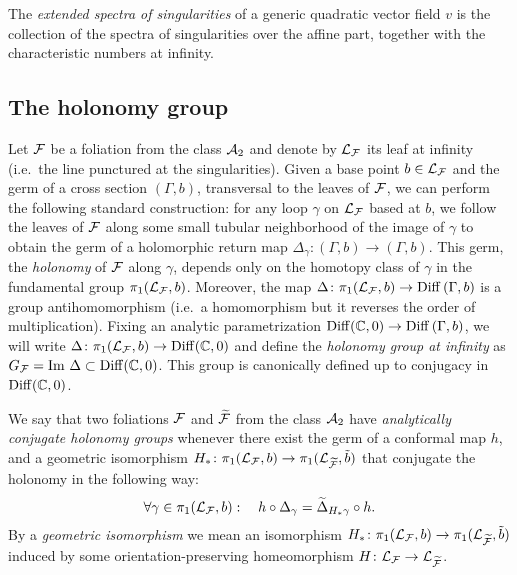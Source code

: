 \documentclass[phd,tocprelim]{cornell}
\begin{document}
\begin{definition}\label{def:extendedSpectra}
 The \textit{extended spectra of singularities} of a generic quadratic vector field $v$ is the collection of the spectra of singularities over the affine part, together with the characteristic numbers at infinity.
\end{definition}


\subsection{The holonomy group}

Let $\mathcal{F}$ be a foliation from the class $\mathcal{A}_2$ and denote by $\mathcal{L}_{\mathcal{F}}$ its leaf at infinity (i.e.~the line punctured at the singularities). Given a base point $b\in\mathcal{L}_{\mathcal{F}}$ and the germ of a cross section $(\Gamma,b)$, transversal to the leaves of $\mathcal{F}$, we can perform the following standard construction: for any loop $\gamma$ on $\mathcal{L}_{\mathcal{F}}$ based at $b$, we follow the leaves of $\mathcal{F}$ along some small tubular neighborhood of the image of $\gamma$ to obtain the germ of a holomorphic return map $\Delta_\gamma\colon (\Gamma,b)\to(\Gamma,b)$. This germ, the \textit{holonomy} of $\mathcal{F}$ along $\gamma$, depends only on the homotopy class of $\gamma$ in the fundamental group $\pi_1(\mathcal{L}_{\mathcal{F}},b)$. Moreover, the map $\Delta\colon\pi_1(\mathcal{L}_{\mathcal{F}},b)\to \operatorname{Diff}\,(\Gamma,b)$ is a group antihomomorphism (i.e.~a homomorphism but it reverses the order of multiplication). Fixing an analytic parametrization $\operatorname{Diff}(\mathbb{C},0)\to \operatorname{Diff}\,(\Gamma,b)$, we will write $\Delta\colon\pi_1(\mathcal{L}_{\mathcal{F}},b)\to\operatorname{Diff}(\mathbb{C},0)$ and define the \textit{holonomy group at infinity} as $G_{\mathcal{F}}=\operatorname{Im}\,\Delta\subset\operatorname{Diff}(\mathbb{C},0)$. This group is canonically defined up to conjugacy in $\operatorname{Diff}(\mathbb{C},0)$.

\begin{definition}\label{def:conjugateholonomy}
 We say that two foliations $\mathcal{F}$ and $\widetilde{\mathcal{F}}$ from the class $\mathcal{A}_2$ have \textit{analytically conjugate holonomy groups} whenever there exist the germ of a conformal map $h$, and a geometric isomorphism $H_{\ast}\colon \pi_1(\mathcal{L}_{\mathcal{F}},b)\to\pi_1(\mathcal{L}_{\widetilde{\mathcal{F}}},\tilde{b})$ that conjugate the holonomy in the following way:
  \[ \forall\gamma\in\pi_1(\LF,b): \quad %
     h\circ\Delta_\gamma = \widetilde{\Delta}_{H_{\ast}\gamma}\circ h. \]
By a \textit{geometric isomorphism} we mean an isomorphism $H_{\ast}\colon \pi_1(\mathcal{L}_{\mathcal{F}},b)\to\pi_1(\mathcal{L}_{\widetilde{\mathcal{F}}},\tilde{b})$ induced by some orientation-preserving homeomorphism $H\colon\mathcal{L}_{\mathcal{F}}\to\mathcal{L}_{\widetilde{\mathcal{F}}}$.
\end{definition}
\end{document}
